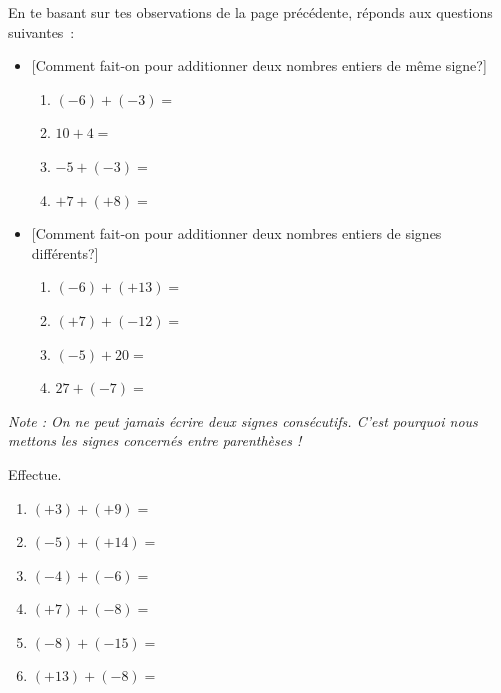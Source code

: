 \documentclass[../../syllabus_1.tex]{subfiles}
\begin{document}
\newpage
En te basant sur tes observations de la page précédente, réponds aux questions suivantes~:

\begin{itemize}[label=$\bullet$]
    \item {}[Comment fait-on pour additionner deux nombres entiers de même signe?]
          \begin{enumerate}[itemsep=1cm, label=\ , cols=2]
              \item $\left(-6\right) + \left(-3\right)=$
              \item $10 + 4=$
              \item $-5 + (-3)=$
              \item $+7 + (+8)=$
          \end{enumerate}
          \vspace{1cm}
    \item {}[Comment fait-on pour additionner deux nombres entiers de signes différents?]
          \begin{enumerate}[itemsep=1cm, label=\ , cols=2]
              \item $\left(-6\right) + \left(+13\right)=$
              \item $\left(+7\right) + \left(-12\right)=$
              \item $(-5)+20=$
              \item $27 +(-7)=$
          \end{enumerate}
          \vspace{1cm}
\end{itemize}
\emph{Note : On ne peut jamais écrire deux signes consécutifs. C'est pourquoi nous mettons les signes concernés entre parenthèses !}

\begin{exercise}
    Effectue.
    \begin{enumerate}[cols=2, itemsep=1.5em]
        \item $( + 3) + ( + 9) =$
        \item $( - 5) + ( + 14)=$
        \item $( - 4) + ( - 6) =$
        \item $( + 7) + ( - 8) =$
        \item $( - 8) + ( - 15) =$
        \item $( + 13) + ( - 8) =$
    \end{enumerate}
\end{exercise}

\newpage
\end{document}
